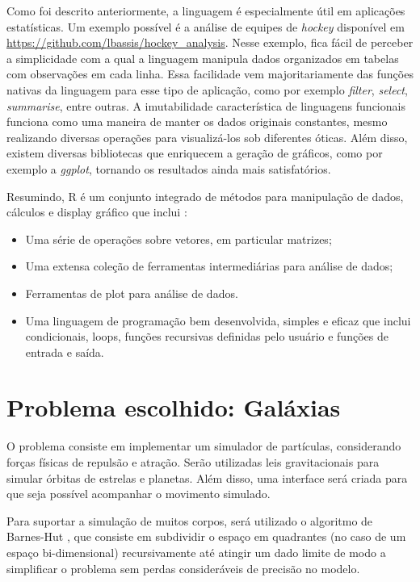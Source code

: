 \documentclass[rel_mlp]{iiufrgs}
\begin{document}
    Como foi descrito anteriormente, a linguagem é especialmente útil em aplicações estatísticas. Um exemplo possível é
    a análise de equipes de \textit{hockey} disponível em \url{https://github.com/lbassis/hockey_analysis}. Nesse exemplo, fica fácil de
    perceber a simplicidade com a qual a linguagem  manipula dados organizados em tabelas com observações em cada linha.
    Essa facilidade vem majoritariamente das funções nativas da linguagem para esse tipo de aplicação, como por exemplo
    \textit{filter}, \textit{select}, \textit{summarise}, entre outras.
    A imutabilidade característica de linguagens funcionais funciona como uma maneira de manter os dados originais
    constantes, mesmo realizando diversas operações para visualizá-los sob diferentes óticas. Além disso,
    existem diversas bibliotecas que enriquecem a geração de gráficos, como por exemplo a \textit{ggplot}, tornando
    os resultados ainda mais satisfatórios.

    Resumindo, R é um conjunto integrado de métodos para manipulação de dados, cálculos e display gráfico que inclui \cite{linguagemR}:


\begin{itemize}
\item Uma série de operações sobre vetores, em particular matrizes;
\item Uma extensa coleção de ferramentas intermediárias para análise de dados;
\item Ferramentas de plot para análise de dados.
\item Uma linguagem de programação bem desenvolvida, simples e eficaz que inclui condicionais, loops, funções recursivas definidas pelo usuário e funções de entrada e saída.
\end{itemize}

\section{Problema escolhido: Galáxias}

	O problema consiste em implementar um simulador de partículas, considerando forças físicas de repulsão e atração. Serão utilizadas leis gravitacionais para simular órbitas de estrelas e planetas. Além disso, uma interface será criada para que seja possível acompanhar o movimento simulado.

    Para suportar a simulação de muitos corpos, será utilizado o algoritmo de Barnes-Hut \cite{Barnes}, que consiste em subdividir o espaço em quadrantes (no caso de um espaço bi-dimensional) recursivamente até atingir um dado limite de modo a simplificar o problema sem perdas consideráveis de precisão no modelo.
\end{document}
